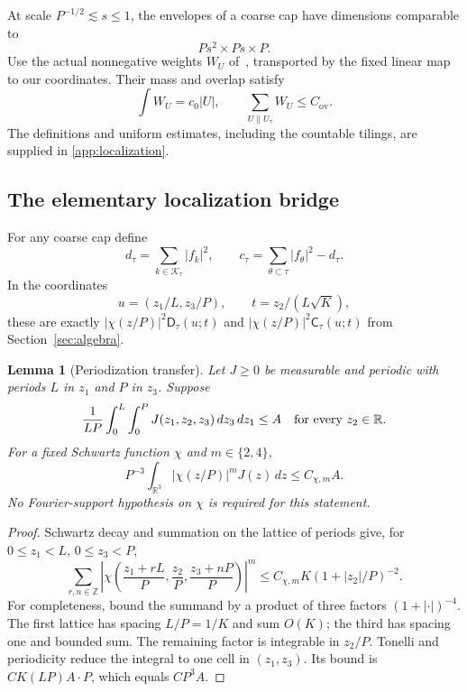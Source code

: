 \documentclass[11pt,reqno]{amsart}
\numberwithin{equation}{section}
\newtheorem{lemma}[lemma]{Lemma}
\theoremstyle{definition}
\theoremstyle{remark}
\newcommand{\R}{\mathbb R}
\newcommand{\Z}{\mathbb Z}
\begin{document}
At scale $P^{-1/2}\lesssim s\le1$, the envelopes of a coarse cap have dimensions
comparable to
\begin{equation}\label{eq:envelopesize}
 Ps^2\times Ps\times P.
\end{equation}
Use the actual nonnegative weights $W_U$ of~\cite{GM}, transported by the fixed
linear map to our coordinates. Their mass and overlap satisfy
\begin{equation}\label{eq:overlap}
 \int W_U=c_0|U|,\qquad \sum_{U\parallel U_\tau}W_U\le C_{\mathrm{ov}}.
\end{equation}
The definitions and uniform estimates, including the countable tilings, are supplied in
\cref{app:localization}.

\subsection{The elementary localization bridge}
For any coarse cap define
\begin{equation}\label{eq:dctau}
 d_\tau=\sum_{k\in\mathcal K_\tau}|f_k|^2,\qquad
 c_\tau=\sum_{\theta\subset\tau}|f_\theta|^2-d_\tau.
\end{equation}
In the coordinates
\[
 u=(z_1/L,z_3/P),\qquad t=z_2/(L\sqrt K),
\]
these are exactly $|\chi(z/P)|^2\mathsf D_\tau(u;t)$ and
$|\chi(z/P)|^2\mathsf C_\tau(u;t)$ from Section~\ref{sec:algebra}.

\begin{lemma}[Periodization transfer]\label{lem:periodization}
Let $J\ge0$ be measurable and periodic with periods $L$ in $z_1$ and $P$ in $z_3$.
Suppose
\[
 \frac1{LP}\int_0^L\int_0^P J(z_1,z_2,z_3)\,dz_3\,dz_1\le A
 \quad\hbox{for every }z_2\in\R.
\]
For a fixed Schwartz function $\chi$ and $m\in\{2,4\}$,
\begin{equation}\label{eq:periodizationtransfer}
 P^{-3}\int_{\R^3}|\chi(z/P)|^mJ(z)\,dz\le C_{\chi,m}A.
\end{equation}
No Fourier-support hypothesis on $\chi$ is required for this statement.
\end{lemma}
\begin{proof}
Schwartz decay and summation on the lattice of periods give, for
$0\le z_1<L$, $0\le z_3<P$,
\begin{equation}\label{eq:periodizedweight}
 \sum_{r,n\in\Z}
 \left|\chi\left(\frac{z_1+rL}{P},\frac{z_2}{P},
                         \frac{z_3+nP}{P}\right)\right|^m
 \le C_{\chi,m}K(1+|z_2|/P)^{-2}.
\end{equation}
For completeness, bound the summand by a product of three factors
$(1+|\cdot|)^{-4}$. The first lattice has spacing $L/P=1/K$ and sum $O(K)$;
the third has spacing one and bounded sum. The remaining factor is integrable in $z_2/P$.
Tonelli and periodicity reduce the integral to one cell in $(z_1,z_3)$.
Its bound is $C K(LP)A\cdot P$, which equals $C P^3 A$.
\end{proof}
\end{document}
